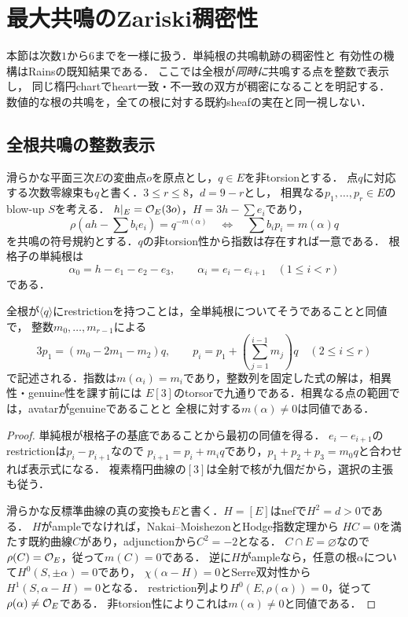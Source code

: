 \section{最大共鳴のZariski稠密性}\label{sec:maximal-density}
本節は次数$1$から$6$までを一様に扱う．単純根の共鳴軌跡の稠密性と
有効性の機構はRainsの既知結果\cite[\S4, pp.~34--35]{Filtered}である．
ここでは全根が\emph{同時に}共鳴する点を整数で表示し，
同じ楕円chartでheart一致・不一致の双方が稠密になることを明記する．
数値的な根の共鳴を，全ての根に対する既約sheafの実在と同一視しない．

\subsection{全根共鳴の整数表示}
滑らかな平面三次$E$の変曲点$o$を原点とし，$q\in E$を非torsionとする．
点$q$に対応する次数零線束も$q$と書く．$3\le r\le8$，$d=9-r$とし，
相異なる$p_1,\ldots,p_r\in E$のblow-up $S$を考える．
$h|_E=\mathcal O_E(3o)$，$H=3h-\sum e_i$であり，
\[
 \rho\left(ah-\sum b_ie_i\right)=q^{-m(\alpha)}
 \quad\Longleftrightarrow\quad \sum b_ip_i=m(\alpha)q
\]
を共鳴の符号規約とする．$q$の非torsion性から指数は存在すれば一意である．
根格子の単純根は
\[
 \alpha_0=h-e_1-e_2-e_3,\qquad
 \alpha_i=e_i-e_{i+1}\quad(1\le i<r)
\]
である．

\begin{proposition}[最大共鳴の九価の整数パラメータ]\label{prop:maximal-integral-chart}
全根が$\langle q\rangle$にrestrictionを持つことは，全単純根についてそうであることと同値で，
整数$m_0,\ldots,m_{r-1}$による
\begin{equation}\label{eq:maximal-integral-chart}
 3p_1=(m_0-2m_1-m_2)q,\qquad
 p_i=p_1+\left(\sum_{j=1}^{i-1}m_j\right)q\quad(2\le i\le r)
\end{equation}
で記述される．指数は$m(\alpha_i)=m_i$であり，整数列を固定した式の解は，相異性・genuine性を課す前には
$E[3]$のtorsorで九通りである．相異なる点の範囲では，avatarがgenuineであることと
全根に対する$m(\alpha)\ne0$は同値である．
\end{proposition}
\begin{proof}
単純根が根格子の基底であることから最初の同値を得る．
$e_i-e_{i+1}$のrestrictionは$p_i-p_{i+1}$なので
$p_{i+1}=p_i+m_iq$であり，$p_1+p_2+p_3=m_0q$と合わせれば表示式になる．
複素楕円曲線の$[3]$は全射で核が九個だから，選択の主張も従う．

滑らかな反標準曲線の真の変換も$E$と書く．$H=[E]$はnefで$H^2=d>0$である．
$H$がampleでなければ，Nakai--MoishezonとHodge指数定理から
$HC=0$を満たす既約曲線$C$があり，adjunctionから$C^2=-2$となる．
$C\cap E=\varnothing$なので$\rho(C)=\mathcal O_E$，従って$m(C)=0$である．
逆に$H$がampleなら，任意の根$\alpha$について$H^0(S,\pm\alpha)=0$であり，
$\chi(\alpha-H)=0$とSerre双対性から$H^1(S,\alpha-H)=0$となる．
restriction列より$H^0(E,\rho(\alpha))=0$，従って$\rho(\alpha)\ne\mathcal O_E$である．
非torsion性によりこれは$m(\alpha)\ne0$と同値である．
\end{proof}

